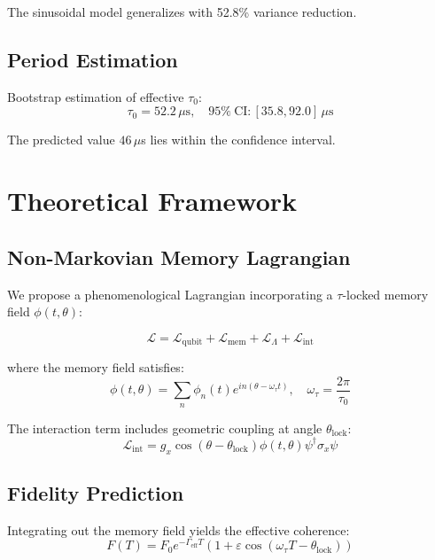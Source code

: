 \documentclass[11pt,twocolumn]{article}
\begin{document}
The sinusoidal model generalizes with 52.8\% variance reduction.

\subsection{Period Estimation}

Bootstrap estimation of effective $\tau_0$:
\begin{equation}
\tau_0 = 52.2\,\mu\mathrm{s}, \quad \mathrm{95\% \ CI}: [35.8, 92.0]\,\mu\mathrm{s}
\end{equation}

The predicted value $46\,\mu$s lies within the confidence interval.

\section{Theoretical Framework}

\subsection{Non-Markovian Memory Lagrangian}

We propose a phenomenological Lagrangian incorporating a $\tau$-locked memory field $\phi(t,\theta)$:

\begin{equation}
\mathcal{L} = \mathcal{L}_{\mathrm{qubit}} + \mathcal{L}_{\mathrm{mem}} + \mathcal{L}_{\Lambda} + \mathcal{L}_{\mathrm{int}}
\end{equation}

where the memory field satisfies:
\begin{equation}
\phi(t,\theta) = \sum_n \phi_n(t) e^{in(\theta - \omega_\tau t)}, \quad \omega_\tau = \frac{2\pi}{\tau_0}
\end{equation}

The interaction term includes geometric coupling at angle $\theta_{\mathrm{lock}}$:
\begin{equation}
\mathcal{L}_{\mathrm{int}} = g_x \cos(\theta - \theta_{\mathrm{lock}}) \phi(t,\theta) \psi^\dagger \sigma_x \psi
\end{equation}

\subsection{Fidelity Prediction}

Integrating out the memory field yields the effective coherence:
\begin{equation}
\boxed{F(T) = F_0 e^{-\Gamma_{\mathrm{eff}} T} \left(1 + \varepsilon \cos(\omega_\tau T - \theta_{\mathrm{lock}})\right)}
\end{equation}
\end{document}
